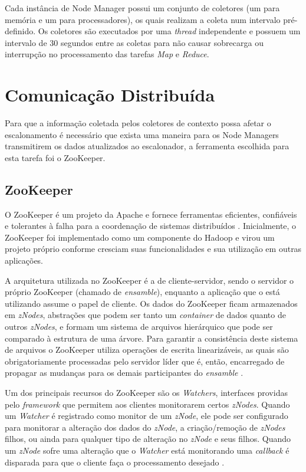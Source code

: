 Cada instância de Node Manager possui um conjunto de coletores (um para memória e um para processadores), os quais realizam a coleta num intervalo pré-definido. Os coletores são executados por uma \textit{thread} independente e possuem um intervalo de 30 segundos entre as coletas para não causar sobrecarga ou interrupção no  processamento das tarefas \textit{Map} e \textit{Reduce}.

\section{Comunicação Distribuída}
\label{sec:zookeeper}

Para que a informação coletada pelos coletores de contexto possa afetar o escalonamento é necessário que exista uma maneira para os Node Managers transmitirem os dados atualizados ao escalonador, a ferramenta escolhida para esta tarefa foi o ZooKeeper.

\subsection{ZooKeeper}
O ZooKeeper é um projeto da Apache e fornece ferramentas eficientes, confiáveis e tolerantes à falha para a coordenação de sistemas distribuídos \cite{Hunt2010}. Inicialmente, o ZooKeeper foi implementado como um componente do Hadoop e virou um projeto próprio conforme cresciam suas funcionalidades e sua utilização em outras aplicações. 

A arquitetura utilizada no ZooKeeper é a de cliente-servidor, sendo o servidor o próprio ZooKeeper (chamado de \textit{ensamble}), enquanto a aplicação que o está utilizando assume o papel de cliente. Os dados do ZooKeeper ficam armazenados em \textit{zNodes}, abstrações que podem ser tanto um \textit{container} de dados quanto de outros \textit{zNodes}, e formam um sistema de arquivos hierárquico que pode ser comparado à estrutura de uma árvore. Para garantir a consistência deste sistema de arquivos o ZooKeeper utiliza operações de escrita linearizáveis, as quais são obrigatoriamente processadas pelo servidor líder que é, então, encarregado de propagar as mudanças para os demais participantes do \textit{ensamble} \cite{Pham}.

Um dos principais recursos do ZooKeeper são os \textit{Watchers}, interfaces providas pelo \textit{framework} que permitem aos clientes monitorarem certos \textit{zNodes}. Quando um \textit{Watcher} é registrado como monitor de um \textit{zNode}, ele pode ser configurado para monitorar a alteração dos dados do \textit{zNode}, a criação/remoção de \textit{zNodes} filhos, ou ainda para qualquer tipo de alteração no \textit{zNode} e seus filhos. Quando um \textit{zNode} sofre uma alteração que o \textit{Watcher} está monitorando uma \textit{callback} é disparada para que o cliente faça o processamento desejado \cite{HadoopBook}.

